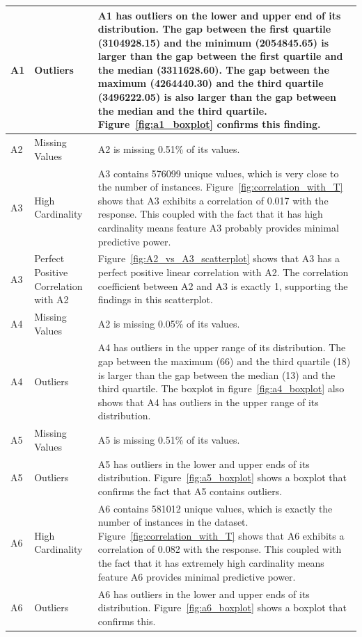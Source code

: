 \documentclass[11pt]{report}
\begin{document}
\begin{longtable}{lp{5cm}p{8cm}}
A1 & Outliers & A1 has outliers on the lower and upper end of its distribution. The gap between the first quartile (3104928.15) and the minimum (2054845.65) is larger than the gap between the first quartile and the median (3311628.60). The gap between the maximum (4264440.30) and the third quartile (3496222.05) is also larger than the gap between the median and the third quartile. Figure~\ref{fig:a1_boxplot} confirms this finding.\\ 
\midrule
A2 & Missing Values &  A2 is missing 0.51\% of its values. \\
\midrule
A3 & High Cardinality &  A3 contains 576099 unique values, which is very close to the number of instances. Figure~\ref{fig:correlation_with_T} shows that A3 exhibits a correlation of 0.017 with the response. This coupled with the fact that it has high cardinality means feature A3 probably provides minimal predictive power.  \\
\midrule
A3 & Perfect Positive Correlation with A2 & Figure~\ref{fig:A2_vs_A3_scatterplot} shows that A3 has a perfect positive linear correlation with A2. The correlation coefficient between A2 and A3 is exactly 1, supporting the findings in this scatterplot. \\
\midrule
A4 & Missing Values &  A2 is missing 0.05\% of its values. \\
\midrule
A4 & Outliers &  A4 has outliers in the upper range of its distribution. The gap between the maximum (66) and the third quartile (18) is larger than the gap between the median (13) and the third quartile. The boxplot in figure~\ref{fig:a4_boxplot} also shows that A4 has outliers in the upper range of its distribution. \\
\midrule
A5 & Missing Values &  A5 is missing 0.51\% of its values. \\
\midrule
A5 & Outliers & A5 has outliers in the lower and upper ends of its distribution. Figure~\ref{fig:a5_boxplot} shows a boxplot that confirms the fact that A5 contains outliers. \\
\midrule
A6 & High Cardinality & A6 contains 581012 unique values, which is exactly the number of instances in the dataset. Figure~\ref{fig:correlation_with_T} shows that A6 exhibits a correlation of 0.082 with the response. This coupled with the fact that it has extremely high cardinality means feature A6 provides minimal predictive power. \\
\midrule
A6 & Outliers & A6 has outliers in the lower and upper ends of its distribution. Figure~\ref{fig:a6_boxplot} shows a boxplot that confirms this. \\

\end{longtable}
\end{document}
